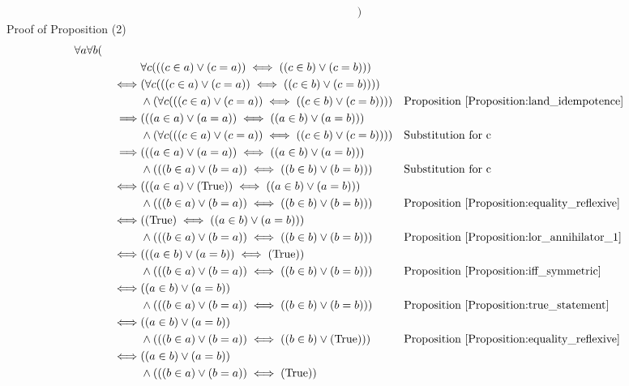 \begin{prop}
\begin{align*}
& )
\end{align*}
Proof of Proposition (2)
\begin{align*}
& \forall a \forall b ( \\
& & & \forall c (((c \in a) \lor (c = a)) \iff ((c \in b) \lor (c = b))) \\
& & \iff & (\forall c (((c \in a) \lor (c = a)) \iff ((c \in b) \lor (c = b)))) \\
& & & \land (\forall c (((c \in a) \lor (c = a)) \iff ((c \in b) \lor (c = b))))
& & \text{Proposition \ref{Proposition:land_idempotence}} \\
& & \implies & (((a \in a) \lor (a = a)) \iff ((a \in b) \lor (a = b))) \\
& & & \land (\forall c (((c \in a) \lor (c = a)) \iff ((c \in b) \lor (c = b))))
& & \text{Substitution for c} \\
& & \implies & (((a \in a) \lor (a = a)) \iff ((a \in b) \lor (a = b))) \\
& & & \land (((b \in a) \lor (b = a)) \iff ((b \in b) \lor (b = b)))
& & \text{Substitution for c} \\
& & \iff & (((a \in a) \lor (\text{True})) \iff ((a \in b) \lor (a = b))) \\
& & & \land (((b \in a) \lor (b = a)) \iff ((b \in b) \lor (b = b)))
& & \text{Proposition \ref{Proposition:equality_reflexive}} \\
& & \iff & ((\text{True}) \iff ((a \in b) \lor (a = b))) \\
& & & \land (((b \in a) \lor (b = a)) \iff ((b \in b) \lor (b = b)))
& & \text{Proposition \ref{Proposition:lor_annihilator_1}} \\
& & \iff & (((a \in b) \lor (a = b)) \iff (\text{True})) \\
& & & \land (((b \in a) \lor (b = a)) \iff ((b \in b) \lor (b = b)))
& & \text{Proposition \ref{Proposition:iff_symmetric}} \\
& & \iff & ((a \in b) \lor (a = b)) \\
& & & \land (((b \in a) \lor (b = a)) \iff ((b \in b) \lor (b = b)))
& & \text{Proposition \ref{Proposition:true_statement}} \\
& & \iff & ((a \in b) \lor (a = b)) \\
& & & \land (((b \in a) \lor (b = a)) \iff ((b \in b) \lor (\text{True})))
& & \text{Proposition \ref{Proposition:equality_reflexive}} \\
& & \iff & ((a \in b) \lor (a = b)) \\
& & & \land (((b \in a) \lor (b = a)) \iff (\text{True}))

\end{align*}
\end{prop}
